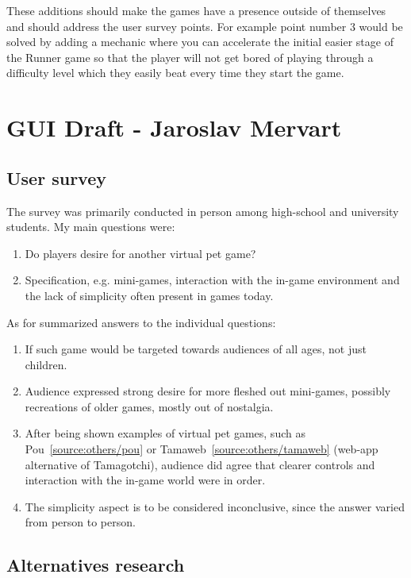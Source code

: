 \documentclass[11pt]{article}
\begin{document}
These additions should make the games have a presence outside of themselves and should address the user survey points. For example point number 3 would be solved by adding a mechanic where you can accelerate the initial easier stage of the Runner game so that the player will not get bored of playing through a difficulty level which they easily beat every time they start the game.
\newpage


\section{GUI Draft - Jaroslav Mervart}
\subsection{User survey}
The survey was primarily conducted in person among high-school and university students. My main questions were:

\begin{enumerate}
    \item Do players desire for another virtual pet game?
    \item Specification, e.g. mini-games, interaction with the in-game environment and the lack of simplicity often present in games today.
\end{enumerate}

\noindent As for summarized answers to the individual questions:

\begin{enumerate}
    \item If such game would be targeted towards audiences of all ages, not just children.
    \item[2] Audience expressed strong desire for more fleshed out mini-games, possibly recreations of older games, mostly out of nostalgia.
    \item[2] After being shown examples of virtual pet games, such as Pou~\ref{source:others/pou} or Tamaweb~\ref{source:others/tamaweb} (web-app alternative of Tamagotchi), audience did agree that clearer controls and interaction with the in-game world were in order.
    \item[2] The simplicity aspect is to be considered inconclusive, since the answer varied from person to person.
\end{enumerate}

\subsection{Alternatives research}
\end{document}
